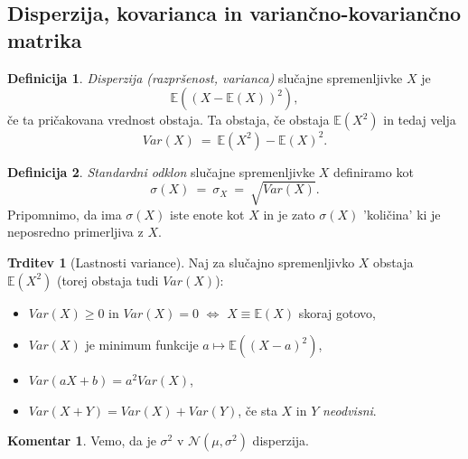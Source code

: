 \documentclass[11pt]{article}
\newcommand{\E}{\mathbb{E}}
\newcommand{\1}{\mathbbm{1}}
\newcommand{\N}{\mathcal{N}}
\theoremstyle{definition}
\newtheorem{definicija}{Definicija}[section]
\theoremstyle{definition}
\newtheorem{trditev}{Trditev}[section]
\theoremstyle{definition}
\newtheorem*{komentar}{Komentar}
\begin{document}

\subsection{Disperzija, kovarianca in variančno-kovariančno matrika}
\vspace{0.5cm}

\begin{definicija}

\textit{Disperzija (razpršenost, varianca)} slučajne spremenljivke $X$ je 
$$\E((X - \E(X))^2),$$
če ta pričakovana vrednost obstaja. Ta obstaja, če obstaja $\E(X^2)$ in tedaj velja
$$Var(X) ~=~ \E(X^2) - \E(X)^2.$$

\end{definicija}
\vspace{0.5cm}

\begin{definicija}

\textit{Standardni odklon} slučajne spremenljivke $X$ definiramo kot
$$\sigma(X) ~=~ \sigma_X ~=~ \sqrt{Var(X)}.$$
Pripomnimo, da ima $\sigma(X)$ iste enote kot $X$ in je zato $\sigma(X)$ 'količina' ki je neposredno primerljiva z $X$.

\end{definicija}
\vspace{0.5cm}

\begin{trditev}[Lastnosti variance]

Naj za slučajno spremenljivko $X$ obstaja $\E(X^2)$ (torej obstaja tudi $Var(X)$):
\begin{itemize}
	\item $Var(X) \geq 0$ in $Var(X) = 0$ $\iff$ $X \equiv \E(X)$ skoraj gotovo,
	
	\item $Var(X)$ je minimum funkcije $a \mapsto \E((X-a)^2)$,
	
	\item $Var(aX+b) = a^2 Var(X)$,
	
	\item $Var(X+Y) = Var(X) + Var(Y)$, če sta $X$ in $Y$ \textit{neodvisni}.
\end{itemize}

\end{trditev}
\vspace{0.5cm}

\begin{komentar}

Vemo, da je $\sigma^2$ v $\N(\mu, \sigma^2)$ disperzija.

\end{komentar}
\vspace{0.5cm}
\end{document}

